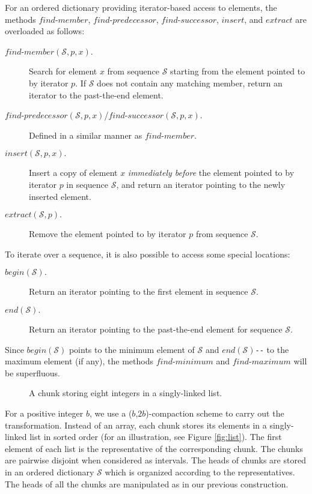\documentclass{DIKU-article}
\newcommand{\Findmin}{\mbox{$\mathit{find}$\textnormal{-}}\allowbreak{}\mbox{$\mathit{minimum}$}}
\newcommand{\Findmax}{\mbox{$\mathit{find}$\textnormal{-}}\allowbreak{}\mbox{$\mathit{maximum}$}}
\newcommand{\Member}{\mbox{$\mathit{find}$\textnormal{-}}\allowbreak{}\mbox{$\mathit{member}$}}
\newcommand{\Predecessor}{\mbox{$\mathit{find}$\textnormal{-}}\allowbreak{}\mbox{$\mathit{predecessor}$}}
\newcommand{\Successor}{\mbox{$\mathit{find}$\textnormal{-}}\allowbreak{}\mbox{$\mathit{successor}$}}
\newcommand{\Insert}{\mbox{$\mathit{insert}$}}
\newcommand{\Extract}{\mbox{$\mathit{extract}$}}
\newcommand{\Begin}{\mbox{$\mathit{begin}$}}
\newcommand{\End}{\mbox{$\mathit{end}$}}
\begin{document}
For an ordered dictionary providing iterator-based access to elements,
the methods \Member{}, \Predecessor{}, \Successor{}, \Insert{}, and
\Extract{} are overloaded as follows:
\begin{description}
\item[\Member{}$(\mathcal{S}, p, x).$] Search for element $x$ from sequence $\mathcal{S}$
starting from the element pointed to by iterator $p$.
If $\mathcal{S}$ does not contain any
matching member, return an iterator to the past-the-end element.

\item[\Predecessor{}$(\mathcal{S}, p, x)$/\Successor{}$(\mathcal{S}, p, x).$] Defined in a
similar manner as \Member{}.

\item[\Insert{}$(\mathcal{S}, p, x).$] Insert a copy of element $x$
\emph{immediately before} the element pointed to by iterator $p$ in
sequence $\mathcal{S}$, and return an iterator pointing to the newly inserted element.

\item[\Extract{}$(\mathcal{S}, p).$] Remove the element pointed to by iterator $p$
from sequence $\mathcal{S}$.
\end{description}
To iterate over a sequence, it is also possible to access some special
locations:
\begin{description}
\item[\Begin{}$(\mathcal{S}).$] Return an iterator pointing to the first element
in sequence $\mathcal{S}$.

\item[\End{}$(\mathcal{S}).$] Return an iterator pointing to the past-the-end
element for sequence $\mathcal{S}$.
\end{description}
Since \Begin$(\mathcal{S})$ points to the minimum element of $\mathcal{S}$ and
\End$(\mathcal{S})$\texttt{-}\texttt{-} to the maximum element (if any),
the methods \Findmin{} and \Findmax{} will be superfluous.

\begin{figure}
\begin{center}

\end{center}
\caption{A chunk storing eight integers in a singly-linked list.\label{fig:heap}}
\end{figure}

For a positive integer $b$, we use a ($b$,$2b$)-compaction scheme to
carry out the transformation. Instead of an array, each chunk stores
its elements in a singly-linked list in sorted order (for an
illustration, see Figure \ref{fig:list}).  The first element of each
list is the representative of the corresponding chunk.  The chunks are
pairwise disjoint when considered as intervals.  The heads of chunks
are stored in an ordered dictionary $\mathcal{S}$ which is organized
according to the representatives.  The heads of all the chunks are
manipulated as in our previous construction.
\end{document}
